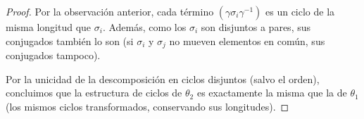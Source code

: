 \begin{proof}
    Por la observación anterior, cada término $(\gamma \sigma_i \gamma^{-1})$ es un ciclo de la misma longitud que $\sigma_i$.
    Además, como los $\sigma_i$ son disjuntos a pares, sus conjugados también lo son (si $\sigma_i$ y $\sigma_j$ no mueven elementos en común, sus conjugados tampoco).
    
    Por la unicidad de la descomposición en ciclos disjuntos (salvo el orden), concluimos que la estructura de ciclos de $\theta_2$ es exactamente la misma que la de $\theta_1$ (los mismos ciclos transformados, conservando sus longitudes).
\end{proof}


